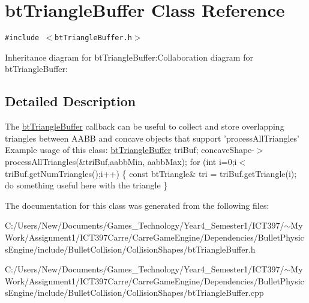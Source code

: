 \hypertarget{classbt_triangle_buffer}{
\section{btTriangleBuffer Class Reference}
\label{classbt_triangle_buffer}
}
{\tt \#include $<$btTriangleBuffer.h$>$}

Inheritance diagram for btTriangleBuffer:Collaboration diagram for btTriangleBuffer:

\subsection{Detailed Description}
The \hyperlink{classbt_triangle_buffer}{btTriangleBuffer} callback can be useful to collect and store overlapping triangles between AABB and concave objects that support 'processAllTriangles' Example usage of this class: \hyperlink{classbt_triangle_buffer}{btTriangleBuffer} triBuf; concaveShape-$>$processAllTriangles(\&triBuf,aabbMin, aabbMax); for (int i=0;i$<$triBuf.getNumTriangles();i++) \{ const btTriangle\& tri = triBuf.getTriangle(i); do something useful here with the triangle \} 

The documentation for this class was generated from the following files:\begin{CompactItemize}
\item 
C:/Users/New/Documents/Games\_\-Technology/Year4\_\-Semester1/ICT397/$\sim$My Work/Assignment1/ICT397Carre/CarreGameEngine/Dependencies/BulletPhysicsEngine/include/BulletCollision/CollisionShapes/btTriangleBuffer.h\item 
C:/Users/New/Documents/Games\_\-Technology/Year4\_\-Semester1/ICT397/$\sim$My Work/Assignment1/ICT397Carre/CarreGameEngine/Dependencies/BulletPhysicsEngine/include/BulletCollision/CollisionShapes/btTriangleBuffer.cpp\end{CompactItemize}
